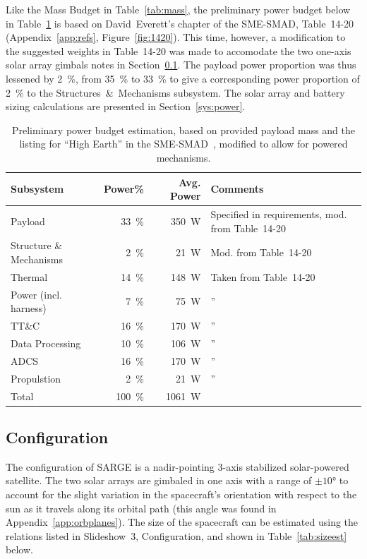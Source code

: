 \documentclass[9pt]{article}
\begin{document}
  Like the Mass Budget in Table~\ref{tab:mass}, the preliminary power budget below in Table~\ref{tab:power} is based on David~Everett's chapter of the SME-SMAD, Table~14-20 (Appendix~\ref{app:refs}, Figure~\ref{fig:1420}).
  This time, however, a modification to the suggested weights in Table~14-20 was made to accomodate the two one-axis solar array gimbals notes in Section~\ref{sec:configuration}. 
The payload power proportion was thus lessened by \qty{2}{\percent}, from \qty{35}{\percent} to \qty{33}{\percent} to give a corresponding power proportion of \qty{2}{\percent} to the Structures~\&~Mechanisms subsystem.
The solar array and battery sizing calculations are presented in Section~\ref{sys:power}.

\begin{table}[h]
  \centering
  \begin{tabular}{l|r r l}
    \toprule
    Subsystem & Power\% & Avg. Power & Comments \\
    \midrule
    Payload & \qty{33}{\percent} & \qty{350}{\watt} & Specified in requirements, mod. from Table~14-20 \\ 
    Structure \& Mechanisms & \qty{2}{\percent} & \qty{21}{\watt} & Mod. from Table~14-20 \\
    Thermal & \qty{14}{\percent} & \qty{148}{\watt} & Taken from Table~14-20 \\
    Power (incl. harness) & \qty{7}{\percent} & \qty{75}{\watt} & ''\\
    TT\&C & \qty{16}{\percent} & \qty{170}{\watt} & ''\\
    Data Processing & \qty{10}{\percent} & \qty{106}{\watt} &''\\
    ADCS & \qty{16}{\percent} & \qty{170}{\watt}&''\\
    Propulstion & \qty{2}{\percent} & \qty{21}{\watt} & ''\\
    \midrule
    Total & \qty{100}{\percent} & \qty{1061}{\watt} &\\
    \bottomrule
  \end{tabular}
  \caption{Preliminary power budget estimation, based on provided payload mass and the listing for ``High Earth'' in the SME-SMAD~\cite{sme}, modified to allow for powered mechanisms.}
  \label{tab:power}
\end{table}

\subsection{Configuration}\label{sec:configuration}
The configuration of SARGE is a nadir-pointing 3-axis stabilized solar-powered satellite.
The two solar arrays are gimbaled in one axis with a range of $\pm\ang{10}$ to account for the slight variation in the spacecraft's orientation with respect to the sun as it travels along its orbital path (this angle was found in Appendix~\ref{app:orbplanes}).
The size of the spacecraft can be estimated using the relations listed in Slideshow~3, Configuration, and shown in Table~\ref{tab:sizeest} below.
\end{document}
